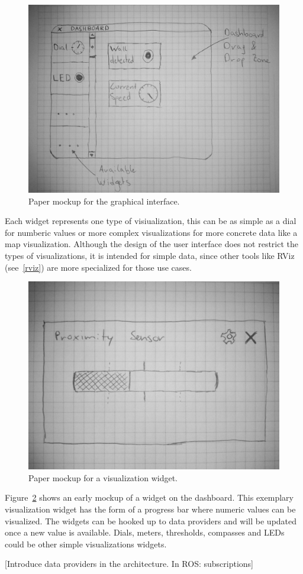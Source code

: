 \begin{figure}[htbp]
  \centering
  \includegraphics[width=\textwidth]{img/initial_gui_mockup.jpg}
  \caption{Paper mockup for the graphical interface.}
  \label{gui_mockup}
\end{figure}

Each widget represents one type of visiualization, this can be as simple as a dial for numberic values or more complex visualizations for more concrete data like a map visualization. Although the design of the user interface does not restrict the types of visualizations, it is intended for simple data, since other tools like RViz (see~\ref{rviz}) are more specialized for those use cases.

\begin{figure}[htbp]
  \centering
  \includegraphics[width=.5\textwidth]{img/initial_widget_mockup.jpg}
  \caption{Paper mockup for a visualization widget.}
  \label{widget_mockup}
\end{figure}

Figure~\ref{widget_mockup} shows an early mockup of a widget on the dashboard. This exemplary visualization widget has the form of a progress bar where numeric values can be visualized. The widgets can be hooked up to data providers and will be updated once a new value is available. Dials, meters, thresholds, compasses and LEDs could be other simple visualizations widgets.

[Introduce data providers in the architecture. In ROS: subscriptions]
